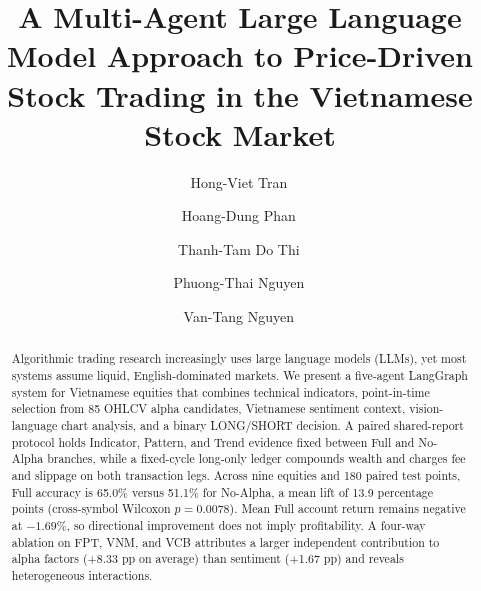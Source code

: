 \begin{frontmatter}


\title{A Multi-Agent Large Language Model Approach to Price-Driven Stock Trading in the Vietnamese Stock Market}

\author[1]{Hong-Viet Tran\,}
\author[1]{Hoang-Dung Phan\,}
\author[1,2]{Thanh-Tam Do Thi\,}
\author[1]{Phuong-Thai Nguyen\,}
\author[3]{Van-Tang Nguyen\,}






\begin{abstract}
Algorithmic trading research increasingly uses large language models (LLMs), yet most systems assume liquid, English-dominated markets. We present a five-agent LangGraph system for Vietnamese equities that combines technical indicators, point-in-time selection from 85 OHLCV alpha candidates, Vietnamese sentiment context, vision-language chart analysis, and a binary LONG/SHORT decision. A paired shared-report protocol holds Indicator, Pattern, and Trend evidence fixed between Full and No-Alpha branches, while a fixed-cycle long-only ledger compounds wealth and charges fee and slippage on both transaction legs. Across nine equities and 180 paired test points, Full accuracy is 65.0\% versus 51.1\% for No-Alpha, a mean lift of 13.9 percentage points (cross-symbol Wilcoxon $p=0.0078$). Mean Full account return remains negative at $-1.69\%$, so directional improvement does not imply profitability. A four-way ablation on FPT, VNM, and VCB attributes a larger independent contribution to alpha factors (+8.33 pp on average) than sentiment (+1.67 pp) and reveals heterogeneous interactions.
\end{abstract}


\end{frontmatter}
